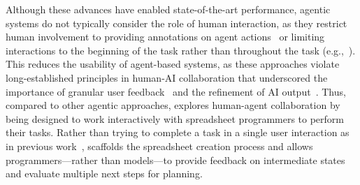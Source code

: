 Although these advances have enabled state-of-the-art performance, agentic systems do not typically consider the role of human interaction, as they restrict human involvement to providing annotations on agent actions~\cite{xi2023rise} or limiting interactions to the beginning of the task rather than throughout the task (e.g.,~\cite{yang2024swe, li2024sheetcopilot}).
This reduces the usability of agent-based systems, as these approaches violate long-established principles in human-AI collaboration that underscored the importance of granular user feedback~\cite{amershi2019guidelines} and the refinement of AI output~\cite{horvitz1999principles}.
Thus, compared to other agentic approaches, \tool explores human-agent collaboration by being designed to work interactively with spreadsheet programmers to perform their tasks.
Rather than trying to complete a task in a single user interaction as in previous work~\cite{li2024sheetcopilot, yang2024swe, tufano2024autodev}, \tool scaffolds the spreadsheet creation process and allows programmers---rather than models---to provide feedback on intermediate states and evaluate multiple next steps for planning.